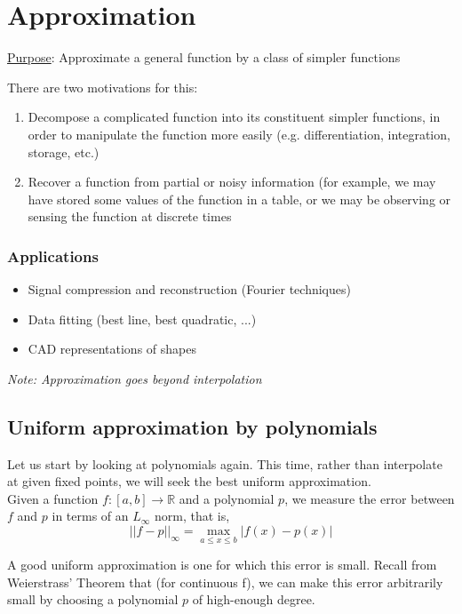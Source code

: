 \chapter{Approximation}
{\parindent0pt
\underline{Purpose}: Approximate a general function by a class of simpler functions

There are two motivations for this:
\begin{enumerate}
    \item Decompose a complicated function into its constituent simpler functions, in order to manipulate the function more easily (e.g. differentiation, integration, storage, etc.)
    \item Recover a function from partial or noisy information (for example, we may have stored some values of the function in a table, or we may be observing or sensing the function at discrete times
\end{enumerate}

\subsection*{Applications}
\begin{itemize}
    \item Signal compression and reconstruction (Fourier techniques)
    \item Data fitting (best line, best quadratic, ...)
    \item CAD representations of shapes
\end{itemize}
\emph{Note: Approximation goes beyond interpolation}

\section{Uniform approximation by polynomials}
Let us start by looking at polynomials again. This time, rather than interpolate at given fixed points, we will seek the best uniform approximation. \\

Given a function $f:[a, b] \rightarrow \mathbb{R}$ and a polynomial $p$, we measure the error between $f$ and $p$ in terms of an $L_\infty$ norm, that is,
\begin{equation*}
    ||f - p||_\infty = \max_{a \leq x \leq b}{|f(x) - p(x)|}
\end{equation*}

A good uniform approximation is one for which this error is small. Recall from Weierstrass' Theorem that (for continuous f), we can make this error arbitrarily small by choosing a polynomial $p$ of high-enough degree. \\

}
